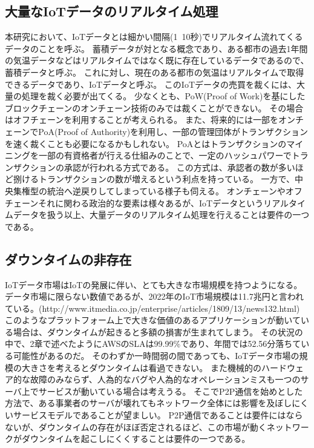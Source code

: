 \subsection{大量なIoTデータのリアルタイム処理}
本研究において、IoTデータとは細かい間隔(1~10秒)でリアルタイム流れてくるデータのことを呼ぶ。
蓄積データが対となる概念であり、ある都市の過去1年間の気温データなどはリアルタイムではなく既に存在しているデータであるので、蓄積データと呼ぶ。
これに対し、現在のある都市の気温はリアルタイムで取得できるデータであり、IoTデータと呼ぶ。
このIoTデータの売買を裁くには、大量の処理を裁く必要が出てくる。
少なくとも、PoW(Proof of Work)を基にしたブロックチェーンのオンチェーン技術のみでは裁くことができない。
その場合はオフチェーンを利用することが考えられる。
また、将来的には一部をオンチェーンでPoA(Proof of Authority)を利用し、一部の管理団体がトランザクションを速く裁くことも必要になるかもしれない。
PoAとはトランザクションのマイニングを一部の有資格者が行える仕組みのことで、一定のハッシュパワーでトランザクションの承認が行われる方式である。
この方式は、承認者の数が多いほど捌けるトランザクションの数が増えるという利点を持っている。
一方で、中央集権型の統治へ逆戻りしてしまっている様子も伺える。
オンチェーンやオフチェーンそれに関わる政治的な要素は様々あるが、IoTデータというリアルタイムデータを扱う以上、大量データのリアルタイム処理を行えることは要件の一つである。

\subsection{ダウンタイムの非存在}
IoTデータ市場はIoTの発展に伴い、とても大きな市場規模を持つようになる。
データ市場に限らない数値であるが、2022年のIoT市場規模は11.7兆円と言われている。(http://www.itmedia.co.jp/enterprise/articles/1809/13/news132.html)
このようなプラットフォーム上で大きな価値のあるアプリケーションが動いている場合は、ダウンタイムが起きると多額の損害が生まれてしまう。
その状況の中で、2章で述べたようにAWSのSLAは99.99\%であり、年間では52.56分落ちている可能性があるのだ。
そのわずか一時間弱の間であっても、IoTデータ市場の規模の大きさを考えるとダウンタイムは看過できない。
また機械的のハードウェア的な故障のみならず、人為的なバグや人為的なオペレーションミスも一つのサーバ上でサービスが動いている場合は考えうる。
そこでP2P通信を始めとした方法で、ある事業者のサーバが壊れてもネットワーク全体には影響を及ぼしにくいサービスモデルであることが望ましい。
P2P通信であることは要件にはならないが、ダウンタイムの存在がほぼ否定されるほど、この市場が動くネットワークがダウンタイムを起こしにくくすることは要件の一つである。



